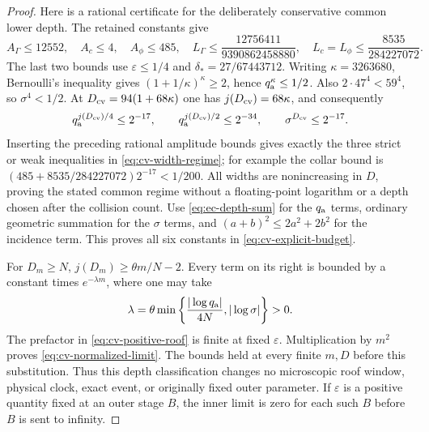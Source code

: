 \begin{proof}
Here is a rational certificate for the deliberately conservative
common lower depth.  The retained constants give
\[
 A_\Gamma\le12552,\quad A_c\le4,\quad A_\phi\le485,\quad
 L_\Gamma\le\frac{12756411}{9390862458880},\quad
 L_c=L_\phi\le\frac{8535}{284227072}.
\]
The last two bounds use $\varepsilon\le1/4$ and
$\delta_*=27/67443712$.  Writing $\kappa=3263680$, Bernoulli's
inequality gives
$(1+1/\kappa)^\kappa\ge2$, hence $q_{\rm a}^\kappa\le1/2$.
Also $2\cdot47^4<59^4$, so $\sigma^4<1/2$.
At $D_{\rm cv}=94(1+68\kappa)$ one has $j(D_{\rm cv})=68\kappa$,
and consequently
\[
 q_{\rm a}^{j(D_{\rm cv})/4}\le2^{-17},\qquad
 q_{\rm a}^{j(D_{\rm cv})/2}\le2^{-34},\qquad
 \sigma^{D_{\rm cv}}\le2^{-17}.
\]
Inserting the preceding rational amplitude bounds gives exactly
the three strict or weak inequalities in
\eqref{eq:cv-width-regime}; for example the collar bound is
$(485+8535/284227072)2^{-17}<1/200$.
All widths are nonincreasing in $D$, proving the stated common
regime without a floating-point logarithm or a depth chosen after
the collision count.
Use \eqref{eq:ec-depth-sum} for the $q_{\rm a}$ terms, ordinary
geometric summation for the $\sigma$ terms, and
$(a+b)^2\le2a^2+2b^2$ for the incidence term.  This proves all
six constants in \eqref{eq:cv-explicit-budget}.

For $D_m\ge N$, $j(D_m)\ge\theta m/N-2$.
Every term on its right is bounded by a constant times
$e^{-\lambda m}$, where one may take
\[
 \lambda=\theta\min\left\{
                  \frac{|\log q_{\rm a}|}{4N},|\log\sigma|\right\}>0.
\]
The prefactor in \eqref{eq:cv-positive-roof} is finite at fixed
$\varepsilon$.  Multiplication by $m^2$ proves
\eqref{eq:cv-normalized-limit}.  The bounds held at every finite
$m,D$ before this substitution.  Thus this depth classification
changes no microscopic roof window, physical clock, exact event,
or originally fixed outer parameter.  If $\varepsilon$ is a
positive quantity fixed at an outer stage $B$, the inner limit is
zero for each such $B$ before $B$ is sent to infinity.
\end{proof}

